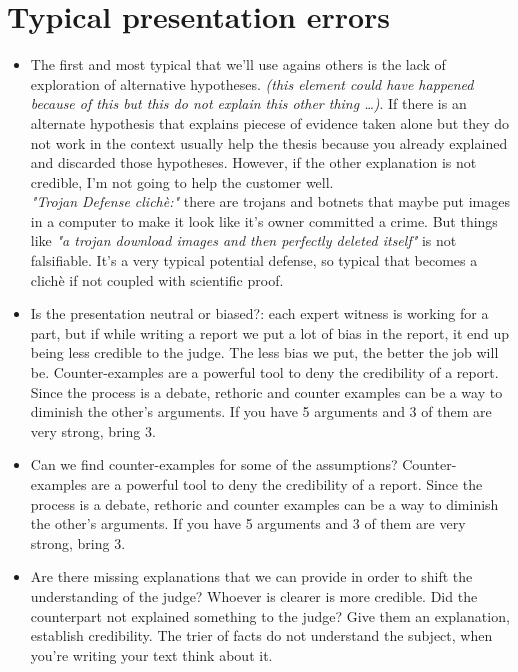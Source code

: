     \section{Typical presentation errors}
        \begin{itemize}
            \item The first and most typical that we'll use agains others is the lack of exploration of alternative hypotheses. \textit{(this element could have happened because of this but this do not explain this other thing \dots)}. If there is an alternate hypothesis that explains piecese of evidence taken alone but they do not work in the context usually help the thesis because you already explained and discarded those hypotheses. However, if the other explanation is not credible, I'm not going to help the customer well.\\
                \textit{"Trojan Defense clichè:"} there are trojans and botnets that maybe put images in a computer to make it look like it's owner committed a crime. But things like \textit{"a trojan download images and then perfectly deleted itself"} is not falsifiable. It's a very typical potential defense, so typical that becomes a clichè if not coupled with scientific proof.
            \item Is the presentation neutral or biased?: each expert witness is working for a part, but if while writing a report we put a lot of bias in the report, it end up being less credible to the judge. The less bias we put, the better the job will be. Counter-examples are a powerful tool to deny the credibility of a report. Since the process is a debate, rethoric and counter examples can be a way to diminish the other's arguments. If you have 5 arguments and 3 of them are very strong, bring 3.
            \item Can we find counter-examples for some of the assumptions? Counter-examples are a powerful tool to deny the credibility of a report. Since the process is a debate, rethoric and counter examples can be a way to diminish the other's arguments. If you have 5 arguments and 3 of them are very strong, bring 3.
            \item Are there missing explanations that we can provide in order to shift the understanding of the judge? Whoever is clearer is more credible. Did the counterpart not explained something to the judge? Give them an explanation, establish credibility. The trier of facts do not understand the subject, when you're writing your text think about it. 
        \end{itemize}
